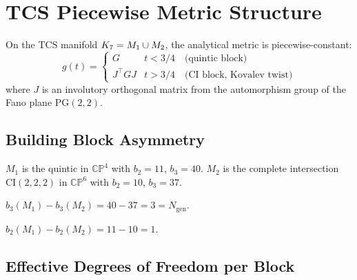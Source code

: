 
\chapter{TCS Piecewise Metric Structure}\label{chap:tcs_piecewise}

On the TCS manifold $K_7 = M_1 \cup M_2$, the analytical metric is
piecewise-constant:
\[
    g(t) = \begin{cases}
        G & t < 3/4 \quad\text{(quintic block)} \\
        J^\top G J & t > 3/4 \quad\text{(CI block, Kovalev twist)}
    \end{cases}
\]
where $J$ is an involutory orthogonal matrix from the automorphism group
of the Fano plane $\mathrm{PG}(2,2)$.

\section{Building Block Asymmetry}

\begin{definition}\label{def:building_blocks}
    \leanok
    $M_1$ is the quintic in $\mathbb{CP}^4$ with $b_2 = 11$, $b_3 = 40$.
    $M_2$ is the complete intersection $\mathrm{CI}(2,2,2)$ in $\mathbb{CP}^6$
    with $b_2 = 10$, $b_3 = 37$.
\end{definition}

\begin{theorem}\label{thm:b3_asymmetry}
    \leanok
    $b_3(M_1) - b_3(M_2) = 40 - 37 = 3 = N_{\mathrm{gen}}$.
\end{theorem}

\begin{theorem}[$b_2$ asymmetry]\label{thm:b2_asymmetry}
    \leanok
    $b_2(M_1) - b_2(M_2) = 11 - 10 = 1$.
\end{theorem}

\section{Effective Degrees of Freedom per Block}

